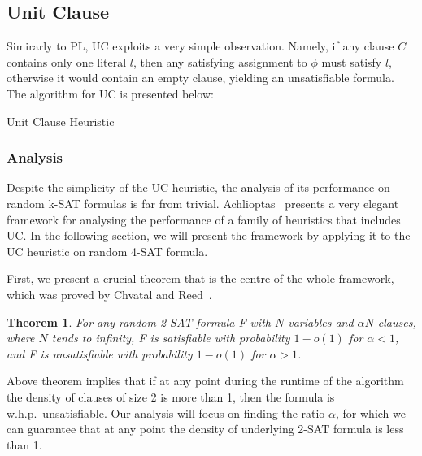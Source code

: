 \documentclass[10pt]{article}
\newtheorem{theorem}{Theorem}[section]
\begin{document}
\subsection{Unit Clause}
Simirarly to PL, UC exploits a very simple observation. Namely, if any clause $C$ contains only one literal $l$, then any satisfying assignment to $\phi$ must satisfy $l$, otherwise it would contain an empty clause, yielding an unsatisfiable formula. The algorithm for UC is presented below:
\begin{algorithm}
\caption{Unit Clause Heuristic}\label{alg:uc}
\end{algorithm}
\subsubsection*{Analysis}
Despite the simplicity of the UC heuristic, the analysis of its performance on random k-SAT formulas is far from trivial. Achlioptas~\cite{satdiffeq} presents a very elegant framework for analysing the performance of a family of heuristics that includes UC\@. In the following section, we will present the framework by applying it to the UC heuristic on random 4-SAT formula.
\par
First, we present a crucial theorem that is the centre of the whole framework, which was proved by Chvatal and Reed~\cite{2satratio}.
\begin{theorem}\label{lem:chvatal}
    For any random 2-SAT formula F with $N$ variables and $\alpha N$ clauses, where $N$ tends to infinity, F is satisfiable with probability $1 - o(1)$ for $\alpha < 1$, and F is unsatisfiable with probability $1 - o(1)$ for $\alpha > 1$.
\end{theorem}
Above theorem implies that if at any point during the runtime of the algorithm the density of clauses of size 2 is more than 1, then the formula is w.h.p.\  unsatisfiable.
Our analysis will focus on finding the ratio $\alpha$, for which we can guarantee that at any point the density of underlying 2-SAT formula is less than 1.


{}
\end{document}
